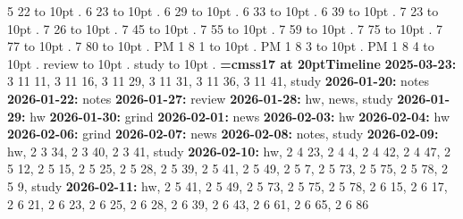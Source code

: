 \smallskip
{} 5 22 \leaders\hbox to 10pt {\hss.\hss}  \hfill {}
\smallskip
{} 6 23 \leaders\hbox to 10pt {\hss.\hss}  \hfill {}
\smallskip
{} 6 29 \leaders\hbox to 10pt {\hss.\hss}  \hfill {}
\smallskip
{} 6 33 \leaders\hbox to 10pt {\hss.\hss}  \hfill {}
\smallskip
{} 6 39 \leaders\hbox to 10pt {\hss.\hss}  \hfill {}
\smallskip
{} 7 23 \leaders\hbox to 10pt {\hss.\hss}  \hfill {}
\smallskip
{} 7 26 \leaders\hbox to 10pt {\hss.\hss}  \hfill {}
\smallskip
{} 7 45 \leaders\hbox to 10pt {\hss.\hss}  \hfill {}
\smallskip
{} 7 55 \leaders\hbox to 10pt {\hss.\hss}  \hfill {}
\smallskip
{} 7 59 \leaders\hbox to 10pt {\hss.\hss}  \hfill {}
\smallskip
{} 7 75 \leaders\hbox to 10pt {\hss.\hss}  \hfill {}
\smallskip
{} 7 77 \leaders\hbox to 10pt {\hss.\hss}  \hfill {}
\smallskip
{} 7 80 \leaders\hbox to 10pt {\hss.\hss}  \hfill {}
\smallskip
\noindent PM 1 8 1 \leaders\hbox to 10pt {\hss.\hss}  \hfill {}
\smallskip
\noindent PM 1 8 3 \leaders\hbox to 10pt {\hss.\hss}  \hfill {}
\smallskip
\noindent PM 1 8 4 \leaders\hbox to 10pt {\hss.\hss}  \hfill {}
\smallskip
\noindent review \leaders\hbox to 10pt {\hss.\hss}  \hfill {}
\smallskip
\noindent study \leaders\hbox to 10pt {\hss.\hss}  \hfill {}
\smallskip
\vfill \break
{\medskip\noindent\bf\font\titlefont=cmss17 at 20pt\titlefont Timeline}\medskip
{\noindent \bf 2025-03-23:} 3 11 11, 3 11 16, 3 11 29, 3 11 31, 3 11 36, 3 11 41, study\smallskip
{\noindent \bf 2026-01-20:} notes\smallskip
{\noindent \bf 2026-01-22:} notes\smallskip
{\noindent \bf 2026-01-27:} review\smallskip
{\noindent \bf 2026-01-28:} hw, news, study\smallskip
{\noindent \bf 2026-01-29:} hw\smallskip
{\noindent \bf 2026-01-30:} grind\smallskip
{\noindent \bf 2026-02-01:} news\smallskip
{\noindent \bf 2026-02-03:} hw\smallskip
{\noindent \bf 2026-02-04:} hw\smallskip
{\noindent \bf 2026-02-06:} grind\smallskip
{\noindent \bf 2026-02-07:} news\smallskip
{\noindent \bf 2026-02-08:} notes, study\smallskip
{\noindent \bf 2026-02-09:} hw, 2 3 34, 2 3 40, 2 3 41, study\smallskip
{\noindent \bf 2026-02-10:} hw, 2 4 23, 2 4 4, 2 4 42, 2 4 47, 2 5 12, 2 5 15, 2 5 25, 2 5 28, 2 5 39, 2 5 41, 2 5 49, 2 5 7, 2 5 73, 2 5 75, 2 5 78, 2 5 9, study\smallskip
{\noindent \bf 2026-02-11:} hw, 2 5 41, 2 5 49, 2 5 73, 2 5 75, 2 5 78, 2 6 15, 2 6 17, 2 6 21, 2 6 23, 2 6 25, 2 6 28, 2 6 39, 2 6 43, 2 6 61, 2 6 65, 2 6 86\smallskip
